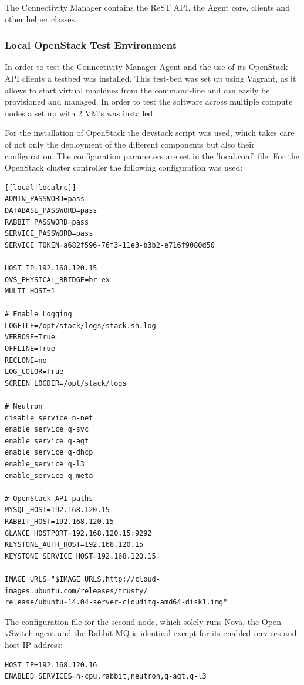 The Connectivity Manager contains the ReST API, the Agent core, clients and other helper classes.

\subsubsection{Local OpenStack Test Environment}

In order to test the Connectivity Manager Agent and the use of its OpenStack API clients a testbed was installed. This test-bed was set up using Vagrant, as it allows to start virtual machines from the command-line and can easily be provisioned and managed. In order to test the software across multiple compute nodes a set up with 2 VM's was installed.

For the installation of OpenStack the devstack script was used, which takes care of not only the deployment of the different components but also their configuration. The configuration parameters are set in the 'local.conf' file. For the OpenStack cluster controller the following configuration was used:

\begin{lstlisting}
[[local|localrc]]
ADMIN_PASSWORD=pass
DATABASE_PASSWORD=pass
RABBIT_PASSWORD=pass
SERVICE_PASSWORD=pass
SERVICE_TOKEN=a682f596-76f3-11e3-b3b2-e716f9080d50

HOST_IP=192.168.120.15
OVS_PHYSICAL_BRIDGE=br-ex
MULTI_HOST=1

# Enable Logging
LOGFILE=/opt/stack/logs/stack.sh.log
VERBOSE=True
OFFLINE=True
RECLONE=no
LOG_COLOR=True
SCREEN_LOGDIR=/opt/stack/logs

# Neutron
disable_service n-net
enable_service q-svc
enable_service q-agt
enable_service q-dhcp
enable_service q-l3
enable_service q-meta

# OpenStack API paths
MYSQL_HOST=192.168.120.15
RABBIT_HOST=192.168.120.15
GLANCE_HOSTPORT=192.168.120.15:9292
KEYSTONE_AUTH_HOST=192.168.120.15
KEYSTONE_SERVICE_HOST=192.168.120.15

IMAGE_URLS="$IMAGE_URLS,http://cloud-images.ubuntu.com/releases/trusty/
release/ubuntu-14.04-server-cloudimg-amd64-disk1.img"
\end{lstlisting}

The configuration file for the second node, which solely runs Nova, the Open vSwitch agent and the Rabbit MQ is identical except for its enabled services and host IP address:

\begin{lstlisting}
HOST_IP=192.168.120.16
ENABLED_SERVICES=n-cpu,rabbit,neutron,q-agt,q-l3
\end{lstlisting}

